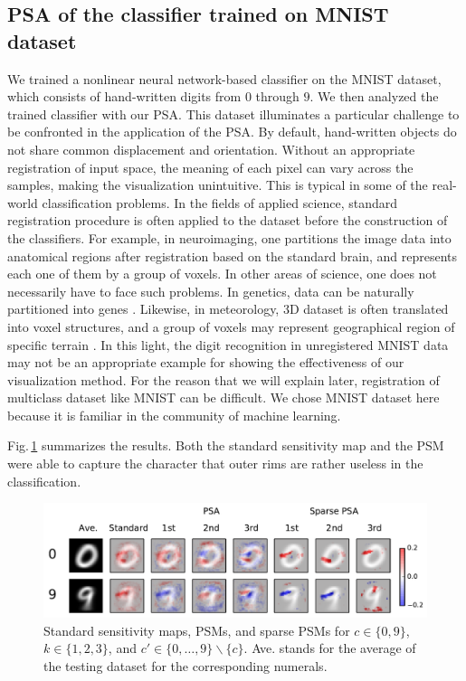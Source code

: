 \subsection{PSA of the classifier trained on MNIST dataset}
We trained a nonlinear neural network-based classifier on the MNIST
dataset, which consists of hand-written digits from $0$ through $9$.
%
We then analyzed the trained classifier with our PSA.
%
This dataset illuminates a particular challenge to be confronted in the application of the PSA.
%
By default, hand-written objects do not share common displacement and orientation.
%
Without an appropriate registration of input space,
the meaning of each pixel can vary across the samples, making the
visualization unintuitive.
%
This is typical in some of the real-world classification problems.
%
In the fields of applied science, standard registration procedure is
often applied to the dataset before the construction of the classifiers.
%
For example, in neuroimaging, one partitions the image data into anatomical
regions after registration based on the standard brain,
and represents each one of them by a group of voxels.
%
In other areas of science, one does not necessarily have to face such problems.
%
In genetics, data can be naturally partitioned into genes \cite{Yukinawa2009}.
%
Likewise, in meteorology, 3D dataset is often translated into voxel
structures, and a group of voxels may represent geographical region of
specific terrain \cite{Kontos2005}.
%
In this light, the digit recognition in unregistered MNIST data may not
be an appropriate example for showing the effectiveness of our visualization method.
For the reason that we will explain later, registration of multiclass
dataset like MNIST can be difficult.
%
We chose MNIST dataset here because it is familiar in the community of
machine learning.

Fig.\,\ref{fig:psms_mnist} summarizes the results.
%
Both the standard sensitivity map and the PSM were able to
capture the character that outer rims are rather useless in the classification.
\begin{figure}[htb]
 \centering
 \includegraphics[width=0.8\columnwidth]{./fig/fig5a.pdf}
 \caption{Standard sensitivity maps, PSMs, and sparse PSMs for
 $c \in \{0, 9\}$, $k \in \{1, 2, 3\}$, and $c' \in \{0, \dots
 ,9\} \backslash \{c\}$.
 Ave. stands for the average of the testing dataset for the corresponding numerals.}
 \label{fig:psms_mnist}
\end{figure}

